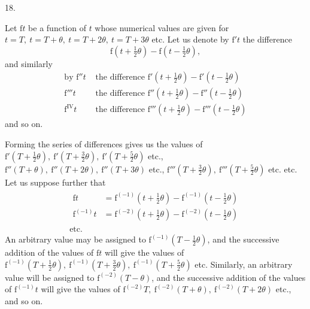\par\begingroup
\setlength{\lineskip}{4pt}\setlength{\lineskiplimit}{4pt}
\bigskip
{}
\begin{center}18.\end{center}
\noindent\hspace*{\parindent}Let \(\mathrm{f}t\) be a function of \(t\) whose numerical values are given for \(t=T,\ t=T+\theta,\ t=T+2\theta,\ t=T+3\theta\) etc. Let us denote by \(\mathrm{f}'t\) the difference
\[
\mathrm{f}(t+\tfrac12\theta)-\mathrm{f}(t-\tfrac12\theta),
\]
and similarly
\[
\begin{aligned}
\text{by }\mathrm{f}''t&\text{ the difference }\mathrm{f}'(t+\tfrac12\theta)-\mathrm{f}'(t-\tfrac12\theta)\\
\mathrm{f}'''t&\text{ the difference }\mathrm{f}''(t+\tfrac12\theta)-\mathrm{f}''(t-\tfrac12\theta)\\
\mathrm{f}^{\mathrm{IV}}t&\text{ the difference }\mathrm{f}'''(t+\tfrac12\theta)-\mathrm{f}'''(t-\tfrac12\theta)
\end{aligned}
\]
and so on.
\par Forming the series of differences gives us the values of \(\mathrm{f}'(T+\tfrac12\theta),\ \mathrm{f}'(T+\tfrac32\theta),\ \mathrm{f}'(T+\tfrac52\theta)\) etc., \(\mathrm{f}''(T+\theta),\ \mathrm{f}''(T+2\theta),\ \mathrm{f}''(T+3\theta)\) etc., \(\mathrm{f}'''(T+\tfrac32\theta),\ \mathrm{f}'''(T+\tfrac52\theta)\) etc. etc. Let us suppose further that
\[
\begin{gathered}
\begin{aligned}
\mathrm{f}t&=\mathrm{f}^{(-1)}(t+\tfrac12\theta)-\mathrm{f}^{(-1)}(t-\tfrac12\theta)\\
\mathrm{f}^{(-1)}t&=\mathrm{f}^{(-2)}(t+\tfrac12\theta)-\mathrm{f}^{(-2)}(t-\tfrac12\theta)
\end{aligned}\\
\text{etc.}
\end{gathered}
\]
An arbitrary value may be assigned to \(\mathrm{f}^{(-1)}(T-\tfrac12\theta)\), and the successive addition of the values of \(\mathrm{f}t\) will give the values of \(\mathrm{f}^{(-1)}(T+\tfrac12\theta),\ \mathrm{f}^{(-1)}(T+\tfrac32\theta),\ \mathrm{f}^{(-1)}(T+\tfrac52\theta)\) etc. Similarly, an arbitrary value will be assigned to \(\mathrm{f}^{(-2)}(T-\theta)\), and the successive addition of the values of \(\mathrm{f}^{(-1)}t\) will give the values of \(\mathrm{f}^{(-2)}T,\ \mathrm{f}^{(-2)}(T+\theta),\ \mathrm{f}^{(-2)}(T+2\theta)\) etc., and so on.
